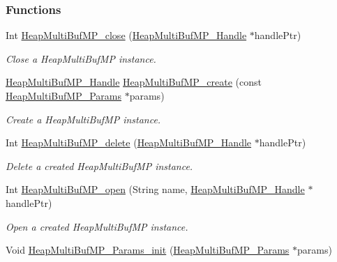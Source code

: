 \subsubsection*{Functions}
\begin{DoxyCompactItemize}
\item 
Int \hyperlink{_heap_multi_buf_m_p_8h_a267f6b50f05a5c859ac38d207020381e}{Heap\-Multi\-Buf\-M\-P\-\_\-close} (\hyperlink{_heap_multi_buf_m_p_8h_a84a0dbef1eb25a19072649a3c30ed4e6}{Heap\-Multi\-Buf\-M\-P\-\_\-\-Handle} $\ast$handle\-Ptr)
\begin{DoxyCompactList}\small\item\em Close a Heap\-Multi\-Buf\-M\-P instance. \end{DoxyCompactList}\item 
\hyperlink{_heap_multi_buf_m_p_8h_a84a0dbef1eb25a19072649a3c30ed4e6}{Heap\-Multi\-Buf\-M\-P\-\_\-\-Handle} \hyperlink{_heap_multi_buf_m_p_8h_a76b4a6dc8007ad99b598aa5a64b0d955}{Heap\-Multi\-Buf\-M\-P\-\_\-create} (const \hyperlink{struct_heap_multi_buf_m_p___params}{Heap\-Multi\-Buf\-M\-P\-\_\-\-Params} $\ast$params)
\begin{DoxyCompactList}\small\item\em Create a Heap\-Multi\-Buf\-M\-P instance. \end{DoxyCompactList}\item 
Int \hyperlink{_heap_multi_buf_m_p_8h_aaa779c5601feba3b7519345823d0df7e}{Heap\-Multi\-Buf\-M\-P\-\_\-delete} (\hyperlink{_heap_multi_buf_m_p_8h_a84a0dbef1eb25a19072649a3c30ed4e6}{Heap\-Multi\-Buf\-M\-P\-\_\-\-Handle} $\ast$handle\-Ptr)
\begin{DoxyCompactList}\small\item\em Delete a created Heap\-Multi\-Buf\-M\-P instance. \end{DoxyCompactList}\item 
Int \hyperlink{_heap_multi_buf_m_p_8h_a0fe88a611f390024e0772876546084cc}{Heap\-Multi\-Buf\-M\-P\-\_\-open} (String name, \hyperlink{_heap_multi_buf_m_p_8h_a84a0dbef1eb25a19072649a3c30ed4e6}{Heap\-Multi\-Buf\-M\-P\-\_\-\-Handle} $\ast$handle\-Ptr)
\begin{DoxyCompactList}\small\item\em Open a created Heap\-Multi\-Buf\-M\-P instance. \end{DoxyCompactList}\item 
Void \hyperlink{_heap_multi_buf_m_p_8h_a0a3a33f3e29e6f78623ec7cb89d2c3a4}{Heap\-Multi\-Buf\-M\-P\-\_\-\-Params\-\_\-init} (\hyperlink{struct_heap_multi_buf_m_p___params}{Heap\-Multi\-Buf\-M\-P\-\_\-\-Params} $\ast$params)

\end{DoxyCompactItemize}

